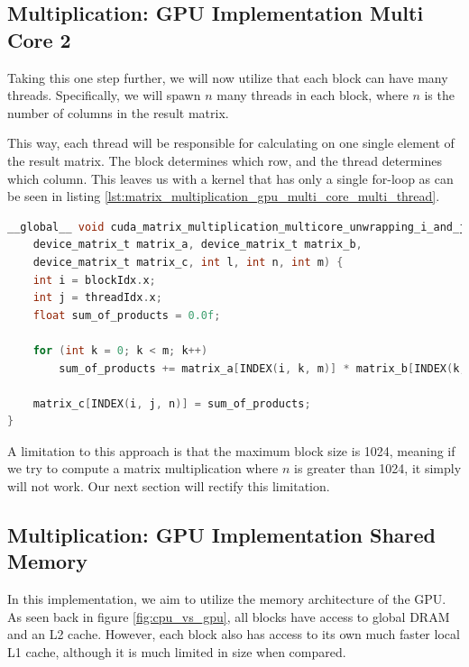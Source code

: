 \subsection{Multiplication: GPU Implementation Multi Core 2}


Taking this one step further, we will now utilize that each block can have many threads. Specifically, we will spawn $n$ many threads in each block, where $n$ is the number of columns in the result matrix. 

This way, each thread will be responsible for calculating on one single element of the result matrix. The block determines which row, and the thread determines which column. This leaves us with a kernel that has only a single for-loop as can be seen in listing \ref{lst:matrix_multiplication_gpu_multi_core_multi_thread}. 

\begin{lstlisting}[language=C, caption={Multi Core Multi Thread Matrix Multiplication}, label={lst:matrix_multiplication_gpu_multi_core_multi_thread}]
__global__ void cuda_matrix_multiplication_multicore_unwrapping_i_and_j_kernel(
    device_matrix_t matrix_a, device_matrix_t matrix_b,
    device_matrix_t matrix_c, int l, int n, int m) {
    int i = blockIdx.x;
    int j = threadIdx.x;
    float sum_of_products = 0.0f;

    for (int k = 0; k < m; k++)
        sum_of_products += matrix_a[INDEX(i, k, m)] * matrix_b[INDEX(k, j, n)];

    matrix_c[INDEX(i, j, n)] = sum_of_products;
}
\end{lstlisting}

A limitation to this approach is that the maximum block size is 1024, meaning if we try to compute a matrix multiplication where $n$ is greater than 1024, it simply will not work. Our next section will rectify this limitation.

\subsection{Multiplication: GPU Implementation Shared Memory}


In this implementation, we aim to utilize the memory architecture of the GPU. As seen back in figure \ref{fig:cpu_vs_gpu}, all blocks have access to global DRAM and an L2 cache. However, each block also has access to its own much faster local L1 cache, although it is much limited in size when compared. 

